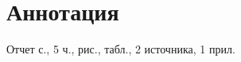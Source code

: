 
\chapter*{Аннотация}

	Отчет \pageref{LastPage} с., %
	5 ч.,                        %
	\totalfigures{} рис.,        %
	\totaltables{} табл.,        %
	2 источника,                 %
	1 прил.                      %
	
	\lipsum[1]
	
